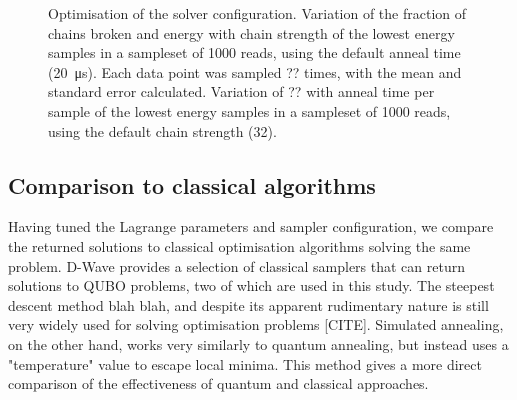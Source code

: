 \documentclass[12pt]{article}
\theoremstyle{definition}
\begin{document}
\begin{figure}
    \centering\footnotesize
    \begin{subfigure}[t]{.5\textwidth}
        \centering
        
        \caption{}
        \label{fig:chain-strength}
    \end{subfigure}\hfill
    \begin{subfigure}[t]{.5\textwidth}
        \centering
        
        \caption{}
        \label{fig:anneal-time}
    \end{subfigure}
    
    \caption[Optimisation of the solver configuration.]{Optimisation of the solver configuration.  Variation of the fraction of chains broken and energy with chain strength of the lowest energy samples in a sampleset of 1000 reads, using the default anneal time (\qty{20}{\us}). Each data point was sampled ?? times, with the mean and standard error calculated.  Variation of ?? with anneal time per sample of the lowest energy samples in a sampleset of 1000 reads, using the default chain strength (\num{32}).}
    \label{fig:solver-configuration}
\end{figure}

\subsection{Comparison to classical algorithms}

Having tuned the Lagrange parameters and sampler configuration, we compare the returned solutions to classical optimisation algorithms solving the same problem. D-Wave provides a selection of classical samplers that can return solutions to QUBO problems, two of which are used in this study. The steepest descent method blah blah, and despite its apparent rudimentary nature is still very widely used for solving optimisation problems [CITE]. Simulated annealing, on the other hand, works very similarly to quantum annealing, but instead uses a "temperature" value to escape local minima. This method gives a more direct comparison of the effectiveness of quantum and classical approaches.
\end{document}

